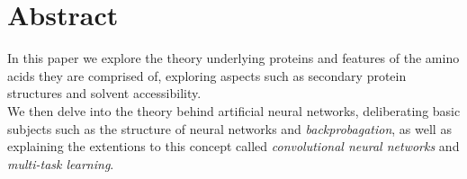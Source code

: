 \section*{Abstract}
In this paper we explore the theory underlying proteins and features of the amino acids they are comprised of, exploring aspects such as secondary protein structures and solvent accessibility.\\
We then delve into the theory behind artificial neural networks, deliberating basic subjects such as the structure of neural networks and \textit{backprobagation}, as well as explaining the extentions to this concept called \textit{convolutional neural networks} and \textit{multi-task learning}.\\
